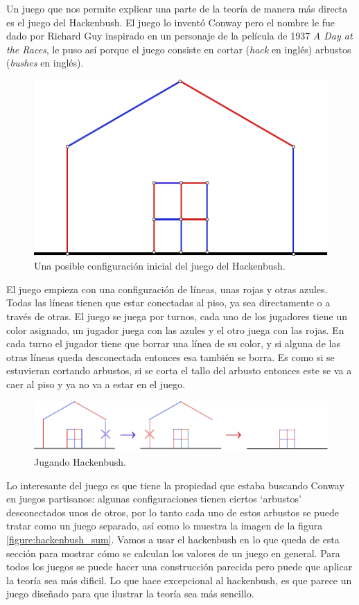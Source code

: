 Un juego que nos permite explicar una parte de la teor\'ia de manera m\'as directa es el juego del Hackenbush. El juego lo invent\'o Conway pero el nombre le fue dado por Richard Guy inspirado en un personaje de la pel\'icula de 1937 \textit{A Day at the Races}, le puso as\'i porque el juego consiste en cortar (\textit{hack} en ingl\'es) arbustos (\textit{bushes} en ingl\'es).

\begin{figure}[h]
    \centering
    \includegraphics[width=.7\textwidth]{images/hackenbush-first_example.pdf}
    \caption{Una posible configuraci\'on inicial del juego del Hackenbush.}
\end{figure}

El juego empieza con una configuraci\'on de l\'ineas, unas rojas y otras azules. Todas las l\'ineas tienen que estar conectadas al piso, ya sea directamente o a trav\'es de otras. El juego se juega por turnos, cada uno de los jugadores tiene un color asignado, un jugador juega con las azules y el otro juega con las rojas. En cada turno el jugador tiene que borrar una l\'inea de su color, y si alguna de las otras l\'ineas queda desconectada entonces esa tambi\'en se borra. Es como si se estuvieran cortando arbustos, si se corta el tallo del arbusto entonces este se va a caer al piso y ya no va a estar en el juego.


\begin{figure}[h]
    \centering
    \includegraphics[width=.7\textwidth]{images/hackenbush-game_example.pdf}
    \caption{Jugando Hackenbush.}
\end{figure}


Lo interesante del juego es que tiene la propiedad que estaba buscando Conway en juegos partisanos: algunas configuraciones tienen ciertos `arbustos' desconectados unos de otros, por lo tanto cada uno de estos arbustos se puede tratar como un juego separado, as\'i como lo muestra la imagen de la figura \ref{figure:hackenbush_sum}. Vamos a usar el hackenbush en lo que queda de esta secci\'on para mostrar c\'omo se calculan los valores de un juego en general. Para todos los juegos se puede hacer una construcci\'on parecida pero puede que aplicar la teor\'ia sea m\'as dificil. Lo que hace excepcional al hackenbush, es que parece un juego diseñado para que ilustrar la teor\'ia sea m\'as sencillo.

